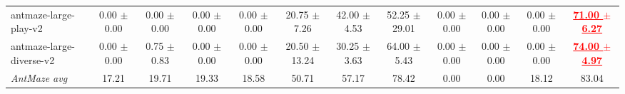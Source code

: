 \documentclass[a4paper]{article}
\begin{document}
\begin{table}[t]
{\begin{tabular}{lccccccccccc}
    antmaze-large-play-v2 & 0.00 $\pm$ 0.00 & 0.00 $\pm$ 0.00 & 0.00 $\pm$ 0.00 & 0.00 $\pm$ 0.00 & 20.75 $\pm$ 7.26 & 42.00 $\pm$ 4.53 & 52.25 $\pm$ 29.01 & 0.00 $\pm$ 0.00 & 0.00 $\pm$ 0.00 & 0.00 $\pm$ 0.00 & \textcolor{red}{\textbf{\underline{71.00 $\pm$ 6.27}}} \\
    antmaze-large-diverse-v2 & 0.00 $\pm$ 0.00 & 0.75 $\pm$ 0.83 & 0.00 $\pm$ 0.00 & 0.00 $\pm$ 0.00 & 20.50 $\pm$ 13.24 & 30.25 $\pm$ 3.63 & 64.00 $\pm$ 5.43 & 0.00 $\pm$ 0.00 & 0.00 $\pm$ 0.00 & 0.00 $\pm$ 0.00 & \textcolor{red}{\textbf{\underline{74.00 $\pm$ 4.97}}} \\
    \midrule
    \textit{AntMaze avg} & 17.21 & 19.71 & 19.33 & 18.58 & 50.71 & 57.17 & 78.42 & 0.00 & 0.00 & 18.12 & 83.04 \\
    \bottomrule
  \end{tabular}
  }
\end{table}
\end{document}
